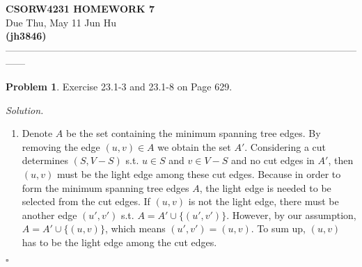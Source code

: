 \documentclass[11pt]{article}
\theoremstyle{definition}
\newtheorem{problem}{Problem}
\newenvironment{solution}{\noindent\emph{Solution.}}{\hfill$\square$}
\newcommand\tab[1][1cm]{\hspace*{#1}}
\begin{document}
\begin{center}
\Large{} 
\textbf{CSORW4231 HOMEWORK 7} \\
\normalsize{}
Due Thu, May 11
\large{Jun Hu \\
\textbf{(jh3846)}} \\ 
------------------------------------------------------------------------------------------------------------------
\end{center}

\begin{problem}
Exercise 23.1-3 and 23.1-8 on Page 629.
\end{problem}

\begin{solution}
\begin{enumerate}
    \item[\textbf{23.1-3}] \tab Denote $A$ be the set containing the minimum spanning tree edges. By removing the edge $(u, v) \in A$ we obtain the set $A'$. Considering a cut determines $(S, V-S)$ s.t. $u \in S$ and $v \in V-S$ and no cut edges in $A'$, then $(u, v)$ must be the light edge among these cut edges. 
    \tab Because in order to form the minimum spanning tree edges $A$, the light edge is needed to be selected from the cut edges. If $(u,v)$ is not the light edge, there must be another edge $(u', v')$ s.t. $A = A' \cup \{ (u', v') \}$. However, by our assumption, $A = A' \cup \{ (u, v) \}$, which means $(u', v') = (u, v)$. To sum up, $(u, v)$ has to be the light edge among the cut edges.
   
    



\end{enumerate}
\end{solution}
\end{document}
